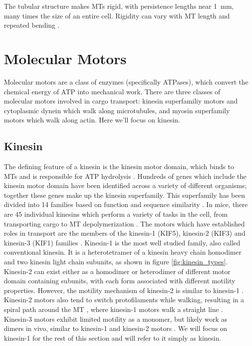 The tubular structure makes MTs rigid, with persistence lengths near \SI{1}{\milli\meter}, many times the size of an entire cell. Rigidity can vary with MT length and repeated bending \cite{Schaedel2015}.

\section{Molecular Motors}

Molecular motors are a class of enzymes (specifically ATPases), which convert the chemical energy of ATP into mechanical work. There are three classes of molecular motors involved in cargo transport: kinesin superfamiliy motors and cytoplasmic dynein which walk along microtubules, and myosin superfamily motors which walk along actin. Here we'll focus on kinesin.

\subsection{Kinesin} \label{sec:kinesin}

The defining feature of a kinesin is the kinesin motor domain, which binds to MTs and is responsible for ATP hydrolysis \cite{Verhey2011}. Hundreds of genes which include the kinesin motor domain have been identified across a variety of different organisms; together these genes make up the kinesin superfamily. This superfamily has been divided into 14 families based on function and sequence similarity \cite{Lawrence2004}. In mice, there are 45 individual kinesins which perform a variety of tasks in the cell, from transporting cargo to MT depolymerization \cite{Hirokawa2009}. The motors which have established roles in transport are the members of the kinesin-1 (KIF5), kinesin-2 (KIF3) and kinesin-3 (KIF1) families \cite{Verhey2011}. Kinesin-1 is the most well studied family, also called conventional kinesin. It is a heterotetramer of a kinesin heavy chain homodimer and two kinesin light chain subunits, as shown in figure \ref{fig:kinesin_types}. Kinesin-2 can exist either as a homodimer or heterodimer of different motor domain containing subunits, with each form associated with different motility properties. However, the motility mechanism of kinesin-2 is similar to kinesin-1 \cite{Andreasson2015b}. Kinesin-2 motors also tend to switch protofilaments while walking, resulting in a spiral path around the MT \cite{Brunnbauer2012}, where kinesin-1 motors walk a straight line \cite{Ray1993}. Kinesin-3 motors exhibit limited motility as a monomer, but likely work as dimers in vivo, similar to kinesin-1 and kinesin-2 motors \cite{Siddiqui2017}. We will focus on kinesin-1 for the rest of this section and will refer to it simply as kinesin.

